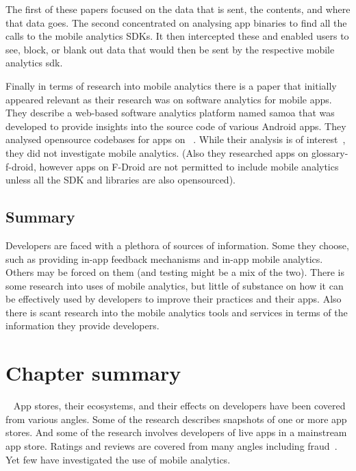 The first of these papers focused on the data that is sent, the contents, and where that data goes. The second concentrated on analysing app binaries to find all the calls to the mobile analytics SDKs. It then intercepted these and enabled users to see, block, or blank out data that would then be sent by the respective mobile analytics \Gls{sdk}.

Finally in terms of research into mobile analytics there is a paper that initially appeared relevant as their research was on software analytics for mobile apps. They describe a web-based software analytics platform named \Gls{samoa} that was developed to provide insights into the source code of various Android apps. They analysed opensource codebases for apps on ~. While their analysis is of interest~, they did not investigate mobile analytics. (Also they researched apps on \Gls{glossary-f-droid}, however apps on F-Droid are not permitted to include mobile analytics unless all the SDK and libraries are also opensourced).

\subsection{Summary} %
Developers are faced with a plethora of sources of information. Some they choose, such as providing in-app feedback mechanisms and in-app mobile analytics. Others may be forced on them (and testing might be a mix of the two). There is some research into uses of mobile analytics, but little of substance on how it can be effectively used by developers to improve their practices and their apps. Also there is scant research into the mobile analytics tools and services in terms of the information they provide developers.

\section{Chapter summary}~\label{rw-summary-section}
App stores, their ecosystems, and their effects on developers have been covered from various angles. Some of the research describes snapshots of one or more app stores. And some of the research involves developers of live apps in a mainstream app store. Ratings and reviews are covered from many angles including fraud~. Yet few have investigated the use of mobile analytics.

